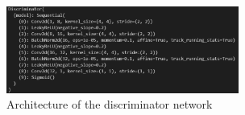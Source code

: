 \documentclass[lettersize,journal]{IEEEtran}
\begin{document}
{    %
    
    \begin{figure}[!h]
    \centering
    \includegraphics[width=3in]{desc_arch.PNG}
    \caption{Architecture of the discriminator network}
    \label{desc_arch}
    \end{figure}
    
}

\vfill
\end{document}
